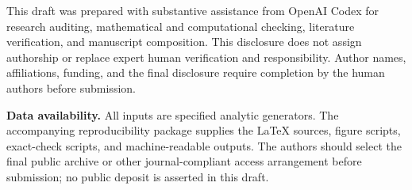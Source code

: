 \documentclass[aps,pre,onecolumn,11pt,longbibliography,notitlepage]{revtex4-2}
\newcommand{\1}{\mathbf 1}
\begin{document}
\begin{acknowledgments}
This draft was prepared with substantive assistance from OpenAI Codex for research auditing, mathematical and computational checking, literature verification, and manuscript composition. This disclosure does not assign authorship or replace expert human verification and responsibility. Author names, affiliations, funding, and the final disclosure require completion by the human authors before submission.
\end{acknowledgments}
\noindent\textbf{Data availability.}
All inputs are specified analytic generators. The accompanying reproducibility package supplies the LaTeX sources, figure scripts, exact-check scripts, and machine-readable outputs. The authors should select the final public archive or other journal-compliant access arrangement before submission; no public deposit is asserted in this draft.

\appendix

\raggedright

\end{document}
